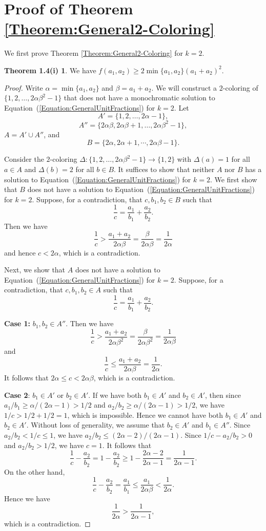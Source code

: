 \documentclass[11pt]{article}
\theoremstyle{definition}
\newtheorem*{thm1.4PartI}{Theorem 1.4(i)}
\begin{document}
\section{Proof of Theorem \ref{Theorem:General2-Coloring}}\label{Section:GeneralTheorem2Coloring}
We first prove Theorem \ref{Theorem:General2-Coloring} for $k=2$.
\begin{thm1.4PartI}\label{Theorem:General2-Coloring_k=2}
    We have $f(a_1,a_2)\geq2\min\{a_1,a_2\}(a_1+a_2)^2$.
\end{thm1.4PartI}
\begin{proof}
    Write $\alpha=\min\{a_1,a_2\}$ and $\beta=a_1+a_2$. We will construct a $2$-coloring of $\{1,2,\ldots,2\alpha\beta^2-1\}$ that does not have a monochromatic solution to Equation~(\ref{Equation:GeneralUnitFractions}) for $k=2$. Let \[A'=\{1,2,\ldots,2\alpha-1\},\]
    \[
    A''=\{2\alpha\beta,2\alpha\beta+1,\ldots,2\alpha\beta^2-1\},
    \]
    $A=A'\cup A''$, and
    \[
    B=\{2\alpha,2\alpha+1,\cdots,2\alpha\beta-1\}.
    \]
    
    Consider the $2$-coloring $\Delta:\{1,2,\ldots,2\alpha\beta^2-1\}\to\{1,2\}$ with $\Delta(a)=1$ for all $a\in A$ and $\Delta(b)=2$ for all $b\in B$. It suffices to show that neither $A$ nor $B$ has a solution to Equation~(\ref{Equation:GeneralUnitFractions}) for $k=2$. We first show that $B$ does not have a solution to Equation~(\ref{Equation:GeneralUnitFractions}) for $k=2$. Suppose, for a contradiction, that $c,b_1,b_2\in B$ such that
    \[
    \frac{1}{c}=\frac{a_1}{b_1}+\frac{a_2}{b_2}.
    \]
    Then we have
    \[
    \frac{1}{c}>\frac{a_1+a_2}{2\alpha\beta}=\frac{\beta}{2\alpha\beta}=\frac{1}{2\alpha}
    \]
    and hence $c<2\alpha$, which is a contradiction.

    Next, we show that $A$ does not have a solution to Equation~(\ref{Equation:GeneralUnitFractions}) for $k=2$. Suppose, for a contradiction, that $c,b_1,b_2\in A$ such that
    \[
    \frac{1}{c}=\frac{a_1}{b_1}+\frac{a_2}{b_2}.
    \]

 {\bf Case 1:} $b_1,b_2\in A''$. Then we have
    \[
    \frac{1}{c}>\frac{a_1+a_2}{2\alpha\beta^2}=\frac{\beta}{2\alpha\beta^2}=\frac{1}{2\alpha\beta}
    \]
    and
    \[
    \frac{1}{c}\leq\frac{a_1+a_2}{2\alpha\beta}=\frac{1}{2\alpha}.
    \]
    It follows that $2\alpha\leq c<2\alpha\beta$, which is a contradiction.

{\bf Case 2}: $b_1\in A'$ or $b_2\in A'$. If we have both $b_1\in A'$ and $b_2\in A'$, then since $a_1/b_1\geq\alpha/(2\alpha-1)>1/2$ and $a_2/b_2\geq\alpha/(2\alpha-1)>1/2$, we have $1/c>1/2+1/2=1$, which is impossible. Hence we cannot have both $b_1\in A'$ and $b_2\in A'$. Without loss of generality, we assume that $b_2\in A'$ and $b_1\in A''$. Since $a_2/b_2<1/c\leq 1$, we have $a_2/b_2\leq (2\alpha-2)/(2\alpha-1)$. Since $1/c-a_2/b_2>0$ and $a_2/b_2>1/2$, we have $c=1$. It follows that
    \[
    \frac{1}{c}-\frac{a_2}{b_2}=1-\frac{a_2}{b_2}\geq1-\frac{2\alpha-2}{2\alpha-1}=\frac{1}{2\alpha-1}.
    \]
    On the other hand, 
    \[
    \frac{1}{c}-\frac{a_2}{b_2}=\frac{a_1}{b_1}\leq\frac{a_1}{2\alpha\beta}<\frac{1}{2\alpha}.
    \]
    Hence we have
    \[
    \frac{1}{2\alpha}>\frac{1}{2\alpha-1},
    \]
    which is a contradiction.
\end{proof}
\end{document}
